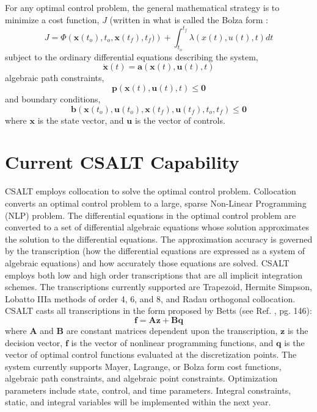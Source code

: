 \documentclass[ISTS  ]{tjsass} %
\begin{document}
For any optimal control problem, the general mathematical strategy is to minimize a cost function, $J$ (written in what is called the Bolza form \cite{Betts:a}:
%
\begin{equation}
   J =\Phi\left(\mathbf{x}(t_o),t_o,\mathbf{x}(t_f),t_f) \right) +  \int_{t_o}^{t_f} \lambda(x(t),u(t),t) dt
\end{equation}
%
subject to the ordinary differential equations describing the system,
%
\begin{equation}
   \dot{\mathbf{x}}(t) = \mathbf{a}(\mathbf{x}(t),\mathbf{u}(t),t)
\end{equation}
%
algebraic path constraints,
%
\begin{equation}
   \mathbf{p}(\mathbf{x}(t),\mathbf{u}(t),t) \leq \mathbf{0}
\end{equation}
%
%
and boundary conditions,
%
\begin{equation}
   \mathbf{b}(\mathbf{x}(t_o),\mathbf{u}(t_o),\mathbf{x}(t_f),\mathbf{u}(t_f),t_o,t_f) \leq   \mathbf{0}
\end{equation}
%
where $\mathbf{x}$ is the state vector, and $\mathbf{u}$ is the vector of controls.

\section{Current CSALT Capability}

CSALT employs collocation to solve the optimal control problem.  Collocation converts an optimal control problem to a large, sparse Non-Linear Programming (NLP)\cite{Nodecal:a} problem.  The differential equations in the optimal control problem are converted to a set of differential algebraic equations whose solution approximates the solution to the differential equations.   The approximation accuracy is governed by the transcription (how the differential equations are expressed as a system of algebraic equations) and how accurately those equations are solved.  CSALT employs both low and high order transcriptions that are all implicit integration schemes.  The transcriptions currently supported are Trapezoid, Hermite Simpson, Lobatto IIIa\cite{Betts:e} methods of order 4, 6, and 8, and Radau orthogonal collocation.   CSALT casts all transcriptions in the form proposed by Betts (see Ref. , pg. 146):
%
\begin{equation}
\mathbf{f} = \mathbf{A} \mathbf{z} + \mathbf{B} \mathbf{q} \label{Eq:BettsNLPForm}
\end{equation}
%
where $\mathbf{A}$ and $\mathbf{B}$ are constant matrices dependent upon the transcription, $\mathbf{z}$ is the decision vector, $\mathbf{f}$ is the vector of nonlinear programming functions, and $\mathbf{q}$ is the vector of optimal control functions evaluated at the discretization points.   The system currently supports Mayer, Lagrange, or Bolza form cost functions, algebraic path constraints, and algebraic point constraints.  Optimization parameters include state, control, and time parameters.  Integral constraints, static, and integral variables will be implemented within the next year.
\end{document}
